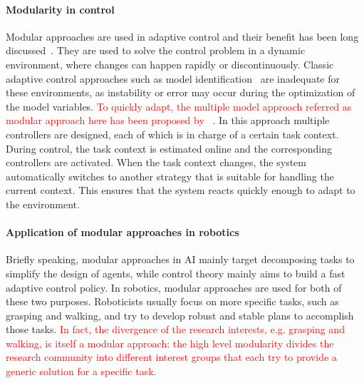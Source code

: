 \paragraph{Modularity in control}
Modular approaches are used in adaptive control and their benefit has been long discussed~\citep{jacobs1991adaptive,narendra1997adaptive}. They are used to solve the control problem in a dynamic environment, where changes can happen rapidly or discontinuously.
Classic adaptive control approaches such as model identification~\citep{khalil2004modeling} are inadequate for these environments, as instability or error may occur during the optimization of the model variables. \textcolor{red}{To quickly adapt, the multiple model approach referred as modular approach here has been proposed by ~\citet{narendra1995adaptation}.}
In this approach multiple controllers are designed, each of which is in charge of a certain task context. During control, the task context is estimated online and the corresponding controllers are activated. When the task context changes, the system automatically switches to another strategy that is suitable for handling the current context. This ensures that the system reacts quickly enough to adapt to the environment.

\paragraph{Application of modular approaches in robotics}
Briefly speaking, modular approaches in AI mainly target decomposing tasks to simplify the design of agents, while control theory mainly aims to build a fast adaptive control policy. In robotics, modular approaches are used for both of these two purposes. Roboticists usually focus on more specific tasks, such as grasping and walking, and try to develop robust and stable plans to accomplish those tasks. \textcolor{red}{In fact, the divergence of the research interests, e.g. grasping and walking, is itself a modular approach: the high level modularity divides the research community into different interest groups that each try to provide a generic solution for a specific task.}

